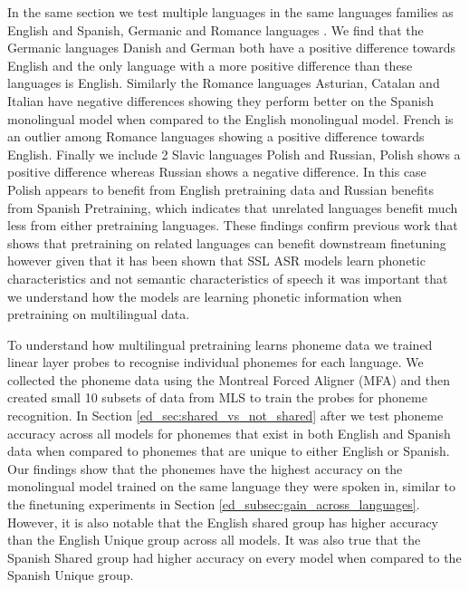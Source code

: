\begin{table}
In the same section we test multiple languages in the same languages families as English and Spanish, Germanic and Romance languages \cite{bauer2007linguistics}. We find that the Germanic languages Danish and German both have a positive difference towards English and the only language with a more positive difference than these languages is English. Similarly the Romance languages Asturian, Catalan and Italian have negative differences showing they perform better on the Spanish monolingual model when compared to the English monolingual model. French is an outlier among Romance languages showing a positive difference towards English. Finally we include 2 Slavic languages Polish and Russian, Polish shows a positive difference whereas Russian shows a negative difference. In this case Polish appears to benefit from English pretraining data and Russian benefits from Spanish Pretraining, which indicates that unrelated languages benefit much less from either pretraining languages. These findings confirm previous work that shows that pretraining on related languages can benefit downstream finetuning \cite{zhang2023fast, gupta2021clsril} however given that it has been shown that SSL ASR models learn phonetic characteristics and not semantic characteristics of speech \cite{pasad2021layer} it was important that we understand how the models are learning phonetic information when pretraining on multilingual data.

To understand how multilingual pretraining learns phoneme data we trained linear layer probes to recognise individual phonemes for each language. We collected the phoneme data using the Montreal Forced Aligner (MFA) and then created small 10 subsets of data from MLS to train the probes for phoneme recognition. In Section \ref{ed_sec:shared_vs_not_shared} after we test phoneme accuracy across all models for phonemes that exist in both English and Spanish data when compared to phonemes that are unique to either English or Spanish. Our findings show that the phonemes have the highest accuracy on the monolingual model trained on the same language they were spoken in, similar to the finetuning experiments in Section \ref{ed_subsec:gain_across_languages}. However, it is also notable that the English shared group has higher accuracy than the English Unique group across all models. It was also true that the Spanish Shared group had higher accuracy on every model when compared to the Spanish Unique group. 


\end{table}
